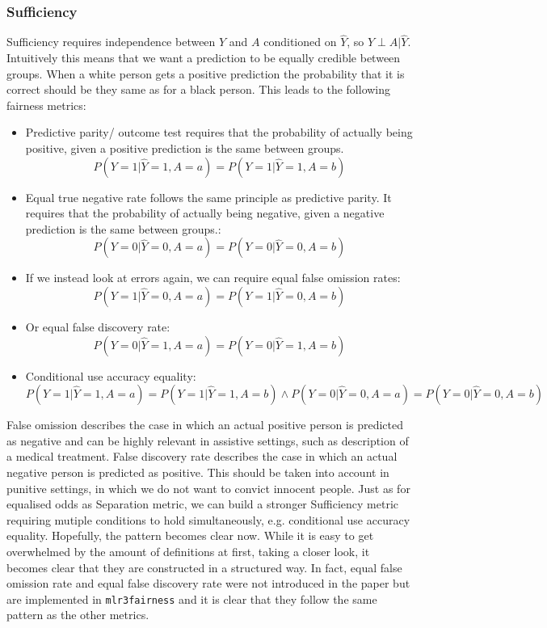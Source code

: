 \subsubsection*{Sufficiency}
Sufficiency requires independence between $Y$ and $A$ conditioned on $\hat{Y}$, so $Y \perp A | \hat{Y}$. Intuitively this means that we want a prediction to be equally credible between groups. When a white person gets a positive prediction the probability that it is correct should be they same as for a black person. This leads to the following fairness metrics:
\begin{itemize}
    \item Predictive parity/ outcome test requires that the probability of actually being positive, given a positive prediction is the same between groups. $$P(Y = 1 | \hat{Y} = 1, A = a) = P(Y = 1 | \hat{Y} = 1, A = b)$$
    \item Equal true negative rate follows the same principle as predictive parity. It requires that the probability of actually being negative, given a negative prediction is the same between groups.: $$P(Y = 0 | \hat{Y} = 0, A = a) = P(Y = 0 | \hat{Y} = 0, A = b)$$
    \item If we instead look at errors again, we can require equal false omission rates: $$P(Y = 1 | \hat{Y} = 0, A = a) = P(Y = 1 | \hat{Y} = 0, A = b)$$
    \item Or equal false discovery rate: $$P(Y = 0 | \hat{Y} = 1, A = a) = P(Y = 0 | \hat{Y} = 1, A = b)$$ 
    \item Conditional use accuracy equality: $$P(Y = 1 | \hat{Y} = 1, A = a) = P(Y = 1 | \hat{Y} = 1, A = b) \land P(Y = 0 | \hat{Y} = 0, A = a) = P(Y = 0 | \hat{Y} = 0, A = b)$$
\end{itemize}

False omission describes the case in which an actual positive person is predicted as negative and can be highly relevant in assistive settings, such as description of a medical treatment. False discovery rate describes the case in which an actual negative person is predicted as positive. This should be taken into account in punitive settings, in which we do not want to convict innocent people.
Just as for equalised odds as Separation metric, we can build a stronger Sufficiency metric requiring mutiple conditions to hold simultaneously, e.g. conditional use accuracy equality.
Hopefully, the pattern becomes clear now. While it is easy to get overwhelmed by the amount of definitions at first, taking a closer look, it becomes clear that they are constructed in a structured way. In fact, equal false omission rate and equal false discovery rate were not introduced in the paper \cite{verma2018} but are implemented in \texttt{mlr3fairness} and it is clear that they follow the same pattern as the other metrics.

